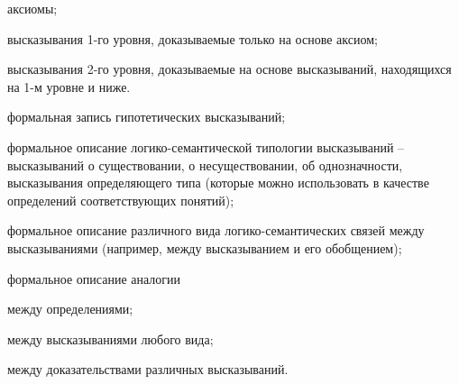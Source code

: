 \begin{SCn}
{\begin{scnitemize}
\begin{scnitemizeii}
\item аксиомы;
\item высказывания 1-го уровня, доказываемые только на основе аксиом;
\item высказывания 2-го уровня, доказываемые на основе высказываний, находящихся на 1-м уровне и ниже.
\end{scnitemizeii}
\item формальная запись гипотетических высказываний;
\item формальное описание логико-семантической типологии высказываний -- высказываний о существовании, о несуществовании, об однозначности, высказывания определяющего  типа (которые можно использовать в качестве определений соответствующих понятий);
\item формальное описание различного вида логико-семантических связей между высказываниями (например, между высказыванием и его обобщением);
\item формальное описание аналогии
\begin{scnitemizeii}
\item между определениями;
\item между высказываниями любого вида;
\item между доказательствами различных высказываний.
\end{scnitemizeii}
\end{scnitemize}
}


\bigskip
\scnendstruct {}


\end{SCn}
